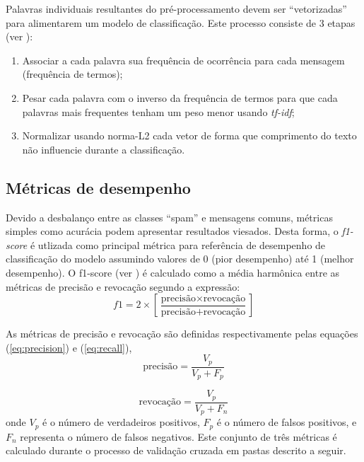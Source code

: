 \documentclass[a4paper,11pt]{article}
\begin{document}
Palavras individuais resultantes do pré-processamento devem ser ``vetorizadas'' para alimentarem 
um modelo de classificação. Este processo consiste de 3 etapas (ver \citet{text}):
\begin{enumerate}
 \item Associar a cada palavra sua frequência de ocorrência para cada mensagem (frequência
 de termos);
 \item Pesar cada palavra com o inverso da frequência de termos para que cada palavras mais 
 frequentes tenham um peso menor usando \textit{tf-idf};
 \item Normalizar usando norma-L2 cada vetor de forma que comprimento do texto não influencie 
 durante a classificação.
\end{enumerate}



\subsection{Métricas de desempenho}

Devido a desbalanço entre as classes ``spam'' e mensagens comuns, métricas simples como acurácia 
podem apresentar resultados viesados. Desta forma, o \textit{f1-score} é utlizada como 
principal métrica para referência de desempenho de classificação do modelo assumindo valores de 
0 (pior desempenho) até 1 (melhor desempenho). O f1-score (ver \citet{f1score}) é calculado como a 
média harmônica entre as métricas de precisão e revocação segundo a expressão:
\begin{equation}
 f1 = 2 \times \left[ \frac{\mbox{precisão} \times \mbox{revocação}}{\mbox{precisão} + \mbox{revocação}} \right]
\end{equation}

As métricas de precisão e revocação são definidas respectivamente pelas equações 
(\ref{eq:precision}) e (\ref{eq:recall}),
\begin{equation}
 \mbox{precisão} = \frac{V_p}{V_p+F_p}
\label{eq:precision} 
\end{equation}

\begin{equation}
 \mbox{revocação} = \frac{V_p}{V_p+F_n}
\label{eq:recall} 
\end{equation}
onde $V_p$ é o número de verdadeiros positivos, $F_p$ é o número de falsos positivos, e $F_n$ 
representa o número de falsos negativos.
Este conjunto de três métricas é calculado durante o processo de validação cruzada em pastas 
descrito a seguir.
\end{document}
